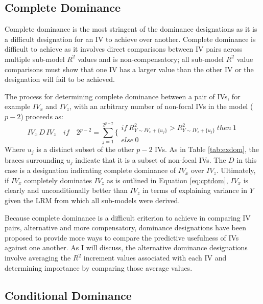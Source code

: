 \documentclass[man]{apa7}
\begin{document}
	\subsection{Complete Dominance}
	
	Complete dominance is the most stringent of the dominance designations as it is a difficult designation for an IV to achieve over another.
	Complete dominance is difficult to achieve as it involves direct comparisons between IV pairs across multiple sub-model $R^2$ values and is non-compensatory; all sub-model $R^2$ value comparisons must show that one IV has a larger value than the other IV or the designation will fail to be achieved.
	
	The process for determining complete dominance between a pair of IVs, for example $IV_x$ and $IV_z$, with an arbitrary number of non-focal IVs in the model ($p - 2$) proceeds as:
	\begin{equation}
		IV_x \, D \, IV_z \quad if \quad 2^{p-2} = \sum^{2^{p-2}}_{j=1} \Biggr\{ 
		\begin{array}{l}
			if \ R^2_{Y \sim IV_x + \{u_j\}} > R^2_{Y \sim IV_z + \{u_j\}} \ then \ 1 \\
			else \ 0 
		\end{array}
		\label{eq:cptdom}
	\end{equation}
	Where $u_j$ is a distinct subset of the other $p - 2$ IVs.
	As in Table \ref{tab:exdom}, the braces surrounding $u_j$ indicate that it is a subset of non-focal IVs.
	The $D$ in this case is a designation indicating complete dominance of $IV_x$ over $IV_z$.
	Ultimately, if $IV_x$ completely dominates $IV_z$ as is outlined in Equation \ref{eq:cptdom}, $IV_x$ is clearly and unconditionally better than $IV_z$ in terms of explaining variance in $Y$ given the LRM from which all sub-models were derived.	
	
	Because complete dominance is a difficult criterion to achieve in comparing IV pairs, alternative and more compensatory, dominance designations have been proposed to provide more ways to compare the predictive usefulness of IVs against one another.
	As I will discuss, the alternative dominance designations involve averaging the $R^2$ increment values associated with each IV and determining importance by comparing those average values.
	
	\subsection{Conditional Dominance}
	
\end{document}
